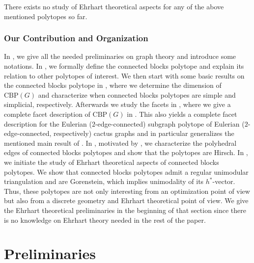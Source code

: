 \documentclass[12pt]{amsart}
\newcommand{\CBP}{\mathrm{CBP}}
\begin{document}
There exists no study of Ehrhart theoretical aspects for any of the above mentioned polytopes so far.

\subsubsection*{\bf Our Contribution and Organization}
In , we give all the needed preliminaries on graph theory and introduce some notations. In , we formally define the connected blocks polytope and explain its relation to other polytopes of interest. We then start with some basic results on the connected blocks polytope in , where we determine the dimension of $\CBP(G)$ and characterize when connected blocks polytopes are simple and simplicial, respectively. Afterwards we study the facets in , where we give a complete facet description of $\CBP(G)$ in . This also yields a complete facet description for the Eulerian ($2$-edge-connected) subgraph polytope of Eulerian ($2$-edge-connected, respectively) cactus graphs and in particular generalizes the mentioned main result of \cite{DKN15}. In , motivated by \cite{cyclepolytope}, we characterize the polyhedral edges of connected blocks polytopes and show that the polytopes are Hirsch. In , we initiate the study of Ehrhart theoretical aspects of connected blocks polytopes. We show that connected blocks polytopes admit a regular unimodular triangulation and are Gorenstein, which implies unimodality of its $h^\ast$-vector. Thus, these polytopes are not only interesting from an optimization point of view but also from a discrete geometry and Ehrhart theoretical point of view. We give the Ehrhart theoretical preliminaries in the beginning of that section since there is no knowledge on Ehrhart theory needed in the rest of the paper.

\section{Preliminaries}

\label{sectionPreliminaries}
\end{document}
